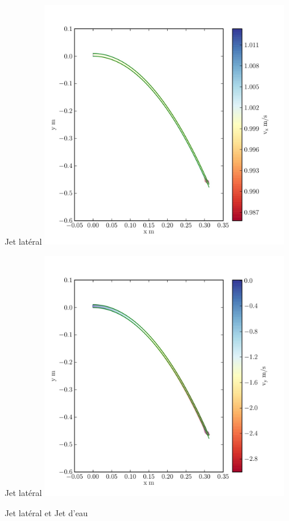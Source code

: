\begin{frame}{Jet latéral}
\includegraphics[width=0.8\textwidth]{plot_10__1_293.jpg}
\end{frame}

\begin{frame}{Jet latéral}
\includegraphics[width=0.8\textwidth]{plot_10__2_293.jpg}
\end{frame}

\begin{frame}{Jet latéral et Jet d'eau}

\end{frame}

